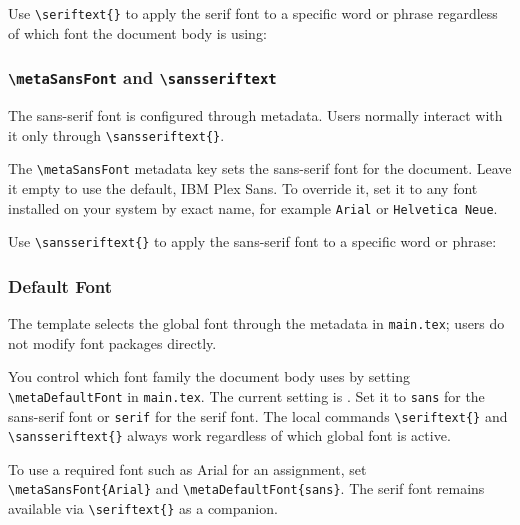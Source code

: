 Use \texttt{\textbackslash seriftext\{\}} to apply the serif font to a specific word or phrase regardless of which font the document body is using:


\subsubsection{\texttt{\textbackslash metaSansFont} and \texttt{\textbackslash sansseriftext}}
\noindent\colorbox{themecolour!15}{\parbox{\linewidth}{\small The sans-serif font is configured through metadata. Users normally interact with it only through \texttt{\textbackslash sansseriftext\{\}}.}}\vspace{0.5\baselineskip}

The \texttt{\textbackslash metaSansFont} metadata key sets the sans-serif font for the document. Leave it empty to use the default, IBM Plex Sans. To override it, set it to any font installed on your system by exact name, for example \texttt{Arial} or \texttt{Helvetica Neue}.

Use \texttt{\textbackslash sansseriftext\{\}} to apply the sans-serif font to a specific word or phrase:


\subsubsection{Default Font}
\noindent\colorbox{themecolour!15}{\parbox{\linewidth}{\small The template selects the global font through the metadata in \texttt{main.tex}; users do not modify font packages directly.}}\vspace{0.5\baselineskip}

You control which font family the document body uses by setting \texttt{\textbackslash metaDefaultFont} in \texttt{main.tex}. The current setting is \texttt{\metaDefaultFont}. Set it to \texttt{sans} for the sans-serif font or \texttt{serif} for the serif font. The local commands \texttt{\textbackslash seriftext\{\}} and \texttt{\textbackslash sansseriftext\{\}} always work regardless of which global font is active.

To use a required font such as Arial for an assignment, set \texttt{\textbackslash metaSansFont\{Arial\}} and \texttt{\textbackslash metaDefaultFont\{sans\}}. The serif font remains available via \texttt{\textbackslash seriftext\{\}} as a companion.

